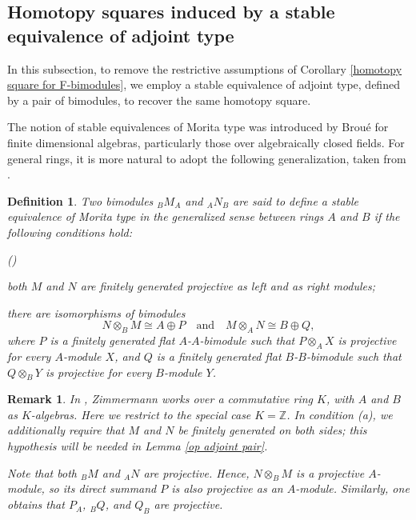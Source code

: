 \documentclass[12pt,twoside]{amsart}
\theoremstyle{bfupright head,slanted body}
\theoremstyle{bfupright head,upright body}
\theoremstyle{fixed bf head,slanted body}
\theoremstyle{fixed bf head,upright body}
\newtheorem{dfn}[res]{Definition}       \newtheorem*{dfn*}{Definition}
\newtheorem{rmk}[res]{Remark}           \newtheorem*{rmk*}{Remark}
\theoremstyle{numbered paragraph}
\newlength{\thmlistleft}        %
\newlength{\thmlistright}       %
\newlength{\thmlistpartopsep}   %
\newlength{\thmlisttopsep}      %
\newlength{\thmlistparsep}      %
\newlength{\thmlistitemsep}     %
\newcounter{prt}
\newenvironment{prt}{\begin{list}{\upshape (\alph{prt})}%
    {\usecounter{prt}%
      \setlength{\leftmargin}{\thmlistleft}%
      \setlength{\labelwidth}{\thmlistleft}%
      \setlength{\rightmargin}{\thmlistright}%
      \setlength{\partopsep}{\thmlistpartopsep}%
      \setlength{\topsep}{\thmlisttopsep}%
      \setlength{\parsep}{\thmlistparsep}%
      \setlength{\itemsep}{\thmlistitemsep}}}%
  {\end{list}}%
\newcommand{\dfncite}[2][?]{\cite[Definition~#1]{#2}}
\numberwithin{equation}{res}
\begin{document}
\subsection{Homotopy squares induced by a stable equivalence of adjoint type}
\label{Homotopy squares via stable equivalence}%
\noindent
In this subsection, to remove the restrictive assumptions of Corollary \ref{homotopy square for F-bimodules}, we employ a stable equivalence of adjoint type, defined by a pair of bimodules, to recover the same homotopy square.

The notion of stable equivalences of Morita type was introduced by Brou\'{e} \cite{1994Bro} for finite dimensional algebras, particularly those over algebraically closed fields. For general rings, it is more natural to adopt the following generalization, taken from \dfncite[5.3.15]{2014Zim}.

\begin{dfn} \label{Stable equivalences of Morita type}
Two bimodules \({}_BM_A\) and \({}_AN_B\) are said to define a \emph{stable equivalence of Morita type in the generalized sense} between rings \(A\) and \(B\) if the following conditions hold:
\begin{prt}
\item both \(M\) and \(N\) are finitely generated projective as left and as right modules;
\item there are isomorphisms of bimodules
\[
N\otimes_B M \cong A\oplus P
\quad\text{and}\quad
M\otimes_A N \cong B\oplus Q,
\]
where \(P\) is a finitely generated flat \(A\)-\(A\)-bimodule such that \(P\otimes_A X\) is projective for every \(A\)-module \(X\), and \(Q\) is a finitely generated flat \(B\)-\(B\)-bimodule such that \(Q\otimes_B Y\) is projective for every \(B\)-module \(Y\).
\end{prt}
\end{dfn}

\begin{rmk} \label{rmk of Morita type}
In \dfncite[5.3.15]{2014Zim}, Zimmermann works over a commutative ring \(K\), with \(A\) and \(B\) as \(K\)-algebras. Here we restrict to the special case \(K=\mathbb Z\). In condition (a), we additionally require that \(M\) and \(N\) be finitely generated on both sides; this hypothesis will be needed in Lemma \ref{op adjoint pair}.

Note that both \({}_B M\) and \({}_A N\) are projective. Hence, \(N\otimes_B M\) is a projective \(A\)-module, so its direct summand \(P\) is also projective as an \(A\)-module. Similarly, one obtains that \(P_A\), \({}_B Q\), and \(Q_B\) are projective.
\end{rmk}
\end{document}
